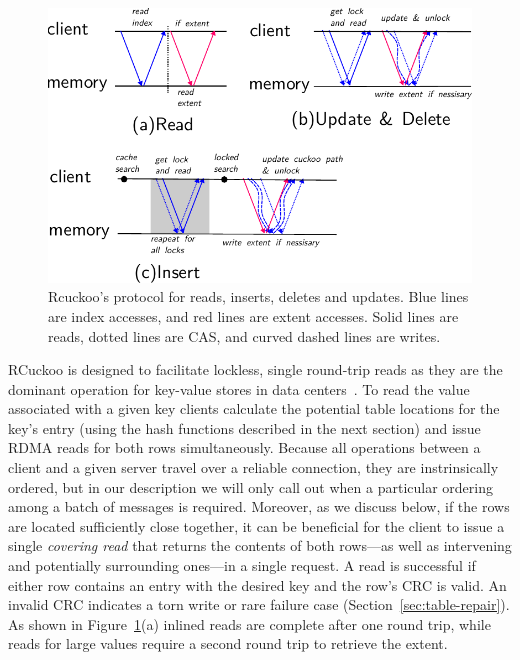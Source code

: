 \begin{figure}[t]
\includegraphics[width=0.99\linewidth]{fig/message_diagram.pdf}
\caption{Rcuckoo's protocol for reads, inserts, deletes and
updates. Blue lines are index accesses, and red lines are
extent accesses. Solid lines are reads, dotted lines are
CAS, and curved dashed lines are writes.}
\label{fig:message_diagram}
\end{figure}

RCuckoo is designed to facilitate lockless, single round-trip reads as
they are the dominant operation for key-value stores in data
centers~\cite{facebook-memcached}. To read the value associated with a
given key clients calculate the potential table locations for the
key's entry (using the hash functions described in the next section)
and issue RDMA reads for both rows simultaneously.  Because all
operations between a client and a given server travel over a reliable
connection, they are instrinsically ordered, but in our description we
will only call out when a particular ordering among a batch of
messages is required.  Moreover, as we discuss below, if the rows are
located sufficiently close together, it can be beneficial for the
client to issue a single \emph{covering read} that returns the
contents of both rows---as well as intervening and potentially
surrounding ones---in a single request.  A read is successful if
either row contains an entry with the desired key and the row's CRC is
valid. An invalid CRC indicates a torn write or rare
failure case (Section~\ref{sec:table-repair}).  As shown in
Figure~\ref{fig:message_diagram}(a) inlined reads are complete after
one round trip, while reads for large values require a second round
trip to retrieve the extent.



